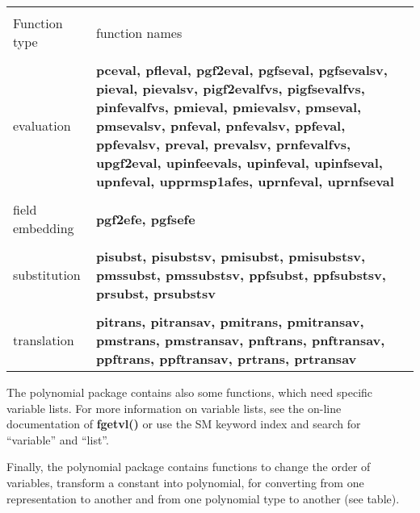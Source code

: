 \leer
\begin{center}
\begin{tabular}{|p{1.1in}|p{4.0in}|}
\hline &\\[-1.3ex]
Function type  &
function names\\[1.5ex]
\hline &\\[-1.3ex]

evaluation & 
{\bf pceval, pfleval, pgf2eval, pgfseval, pgfsevalsv, pieval, pievalsv, 
        pigf2evalfvs, pigfsevalfvs, pinfevalfvs, \newline
        pmieval, pmievalsv, pmseval, pmsevalsv, pnfeval, \newline
        pnfevalsv, ppfeval, ppfevalsv, preval, prevalsv, \newline
        prnfevalfvs, upgf2eval, upinfeevals, upinfeval, \newline
        upinfseval, upnfeval, upprmsp1afes, uprnfeval, \newline
        uprnfseval }\\[1.5ex]
\hline &\\[-1.3ex]

field embedding & 
{\bf pgf2efe, pgfsefe }\\[1.5ex]
\hline &\\[-1.3ex]

substitution & 
{\bf pisubst, pisubstsv, pmisubst, pmisubstsv, pmssubst, pmssubstsv, ppfsubst,
        ppfsubstsv, prsubst, prsubstsv }\\[1.5ex]
\hline &\\[-1.3ex]

translation & 
{\bf pitrans, pitransav, pmitrans, pmitransav, pmstrans, pmstransav, pnftrans, pnftransav, ppftrans, \newline
ppftransav, prtrans, prtransav }\\[1.5ex]
\hline 
\end{tabular}
\end{center}

\leer

The polynomial package contains also some functions, which need specific
variable lists. For more information on variable lists, see the on-line 
documentation of {\bf fgetvl()} or use the SM keyword index and search for
``variable'' and ``list''.

\leer

Finally, the polynomial package contains functions to change the order of
variables, transform a constant into polynomial, for converting from one
representation to another and from one polynomial type to another (see
table).

